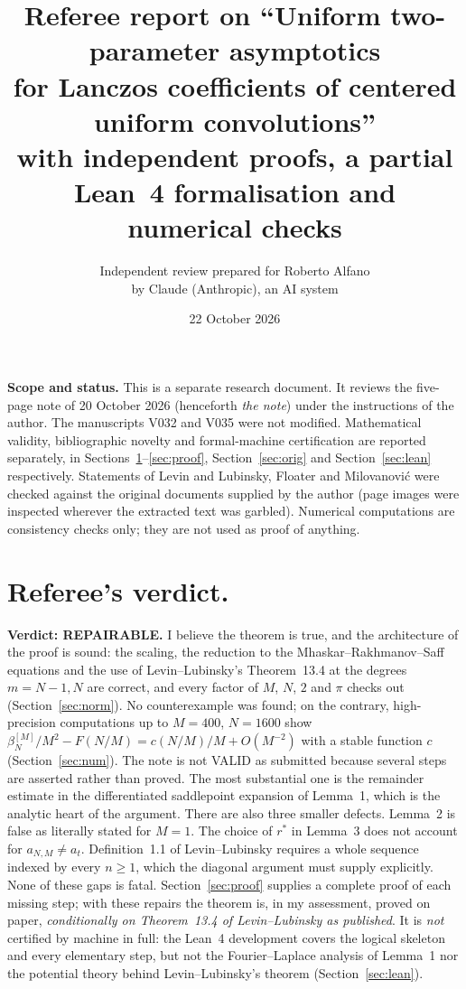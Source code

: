 \documentclass[11pt,a4paper]{article}
\title{Referee report on ``Uniform two-parameter asymptotics\\ for Lanczos
coefficients of centered uniform convolutions''\\[4pt]
\large with independent proofs, a partial Lean~4 formalisation and numerical checks}
\author{Independent review prepared for Roberto Alfano\\ by Claude (Anthropic), an AI system}
\date{22 October 2026}
\theoremstyle{remark}
\numberwithin{equation}{section}
\begin{document}
\maketitle

\noindent\textbf{Scope and status.} This is a separate research document. It reviews the
five-page note of 20 October 2026 (henceforth \emph{the note}) under the instructions of
the author. The manuscripts V032 and V035 were not modified. Mathematical validity,
bibliographic novelty and formal-machine certification are reported separately, in
Sections~\ref{sec:verdict}--\ref{sec:proof}, Section~\ref{sec:orig} and
Section~\ref{sec:lean} respectively. Statements of Levin and Lubinsky, Floater and
Milovanovi\'c were checked against the original documents supplied by the author
(page images were inspected wherever the extracted text was garbled). Numerical
computations are consistency checks only; they are not used as proof of anything.

\section{Referee's verdict.}\label{sec:verdict}

\textbf{Verdict: REPAIRABLE.} I believe the theorem is true, and the architecture of the
proof is sound: the scaling, the reduction to the Mhaskar--Rakhmanov--Saff equations and
the use of Levin--Lubinsky's Theorem~13.4 at the degrees $m=N-1,N$ are correct, and every
factor of $M$, $N$, $2$ and $\pi$ checks out (Section~\ref{sec:norm}). No counterexample
was found; on the contrary, high-precision computations up to $M=400$, $N=1600$ show
$\beta_N^{[M]}/M^2-F(N/M)=c(N/M)/M+O(M^{-2})$ with a stable function $c$
(Section~\ref{sec:num}). The note is not VALID as submitted because several steps are
asserted rather than proved. The most substantial one is the remainder estimate in the
differentiated saddlepoint expansion of Lemma~1, which is the analytic heart of the
argument. There are also three smaller defects. Lemma~2 is false as literally stated for
$M=1$. The choice of $r^*$ in Lemma~3 does not account for $a_{N,M}\neq a_t$. Definition~1.1
of Levin--Lubinsky requires a whole sequence indexed by every $n\ge1$, which the diagonal
argument must supply explicitly. None of these gaps is fatal. Section~\ref{sec:proof}
supplies a complete proof of each missing step; with these repairs the theorem is, in my
assessment, proved on paper, \emph{conditionally on Theorem~13.4 of Levin--Lubinsky as
published}. It is \emph{not} certified by machine in full: the Lean~4 development covers
the logical skeleton and every elementary step, but not the Fourier--Laplace analysis of
Lemma~1 nor the potential theory behind Levin--Lubinsky's theorem (Section~\ref{sec:lean}).
\end{document}
